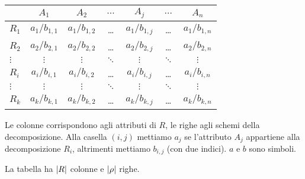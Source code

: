 \begin{center}
\begin{tabular}{l | *{6}{c}}
& $A_1$ & $A_2$ & $\dots$ & $A_j$ & $\dots$ & $A_n$ \\
\hline
$R_1$ & $a_{1} / b_{1,1}$ & $a_{1} / b_{1,2}$ & \dots & $a_{1} / b_{1,j}$ & \dots & $a_{1} / b_{1,n}$ \\
$R_2$ & $a_{2} / b_{2,1}$ & $a_{2} / b_{2,2}$ & \dots & $a_{2} / b_{2,j}$ & \dots & $a_{2} / b_{2,n}$ \\
$\vdots$ & $\vdots$ & $\vdots$ & $\ddots$ & $\vdots$ & $\ddots$ & $\vdots$ \\
$R_i$ & $a_{i} / b_{i,1}$ & $a_{i} / b_{i,2}$ & \dots & $a_{i} / b_{i,j}$ & \dots & $a_{i} / b_{i,n}$ \\
$\vdots$ & $\vdots$ & $\vdots$ & $\ddots$ & $\vdots$ & $\ddots$ & $\vdots$ \\
$R_k$ & $a_{k} / b_{k,1}$ & $a_{k} / b_{k,2}$ & \dots & $a_{k} / b_{k,j}$ & \dots & $a_{k} / b_{k,n}$
\end{tabular}
\end{center}

Le colonne corrispondono agli attributi di $R$, le righe agli schemi della decomposizione. Alla casella $(i, j)$ mettiamo $a_j$ se l'attributo $A_j$ appartiene alla decomposizione $R_i$, altrimenti mettiamo $b_{i,j}$ (con due indici). $a$ e $b$ sono simboli.

La tabella ha $\left\lvert{R}\right\rvert$ colonne e $\left\lvert{\rho}\right\rvert$ righe.

